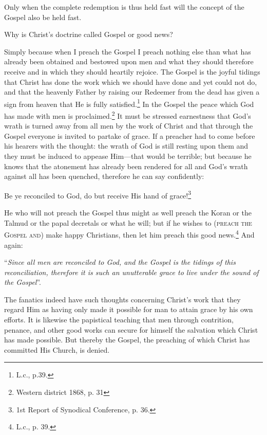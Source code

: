                 Only when the complete redemption is thus held fast will the concept of the Gospel also be held fast.  \begin{displayquote}{\footnotesize Why is Christ’s doctrine called Gospel or good news?}\end{displayquote}  Simply because when I preach the Gospel I preach nothing else than what has already been obtained and bestowed upon men and what they should therefore receive and in which they should heartily rejoice.  The Gospel is the joyful tidings that Christ has done the work which we should have done and yet could not do, and that the heavenly Father by raising our Redeemer from the dead has given a sign from heaven that He is fully satisfied.\footnote{L.c., p.39.} In the Gospel the peace which God has made with men is proclaimed.\footnote{Western district 1868, p. 31}  It must be stressed earnestness that God’s wrath is turned away from all men by the work of Christ and that through the Gospel everyone is invited to partake of grace.  If a preacher had to come before his hearers with the thought: the wrath of God is still resting upon them and they must be induced to appease Him---that would be terrible; but because he knows that the atonement has already been rendered for all and God’s wrath against all has been quenched, therefore he can say confidently:\begin{displayquote} Be ye reconciled to God, do but receive His hand of grace!\footnote{1st Report of Synodical Conference, p. 36.}\end{displayquote}  He who will not preach the Gospel thus might as well preach the Koran or the Talmud or the papal decretals or what he will;  but if he wishes to {\scriptsize\textsc{(preach the Gospel and)}} make happy Christians, then let him preach this good news.\footnote{L.c., p. 39.} And again: \begin{displayquote}“\textit{Since all men are reconciled to God, and the Gospel is the tidings of this reconciliation, therefore it is such an unutterable grace to live under the sound of the Gospel}”.\end{displayquote}  The fanatics indeed have such thoughts concerning Christ’s work that they regard Him as having only made it possible for man to attain grace by his own efforts.  It is likewise the papistical teaching that men through contrition, penance, and other good works can secure for himself the salvation which Christ has made possible.  But thereby the Gospel, the preaching of which Christ has committed His Church, is denied.

